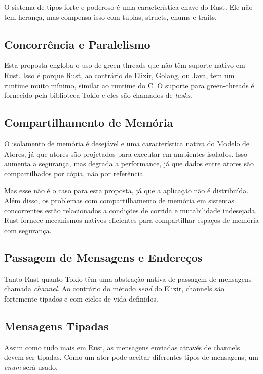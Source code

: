 O sistema de tipos forte e poderoso é uma característica-chave do Rust. Ele não tem herança, mas compensa isso com tuplas, structs, enums e traits.

\subsection{Concorrência e Paralelismo}

Esta proposta engloba o uso de green-threads que não têm suporte nativo em Rust. Isso é porque Rust, ao contrário de Elixir, Golang, ou Java, tem um runtime muito mínimo, similar ao runtime do C. O suporte para green-threads é fornecido pela biblioteca Tokio e eles são chamados de \emph{tasks}.

\subsection{Compartilhamento de Memória}

O isolamento de memória é desejável e uma característica nativa do Modelo de Atores, já que atores são projetados para executar em ambientes isolados. Isso aumenta a segurança, mas degrada a performance, já que dados entre atores são compartilhados por cópia, não por referência.

Mas esse não é o caso para esta proposta, já que a aplicação não é distribuída. Além disso, os problemas com compartilhamento de memória em sistemas concorrentes estão relacionados a condições de corrida e mutabilidade indesejada. Rust fornece mecanismos nativos eficientes para compartilhar espaços de memória com segurança.

\subsection{Passagem de Mensagens e Endereços}

Tanto Rust quanto Tokio têm uma abstração nativa de passagem de mensagens chamada \emph{channel}. Ao contrário do método \emph{send} do Elixir, channels são fortemente tipados e com ciclos de vida definidos.

\subsection{Mensagens Tipadas}

Assim como tudo mais em Rust, as mensagens enviadas através de channels devem ser tipadas. Como um ator pode aceitar diferentes tipos de mensagens, um \emph{enum} será usado.

